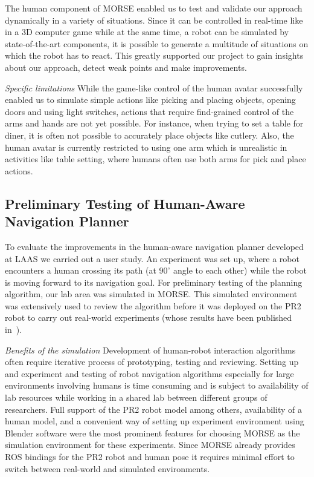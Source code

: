 \documentclass{llncs}
\begin{document}
The human component of MORSE enabled us to test and validate our approach
dynamically in a variety of situations. Since it can be controlled in real-time
like in a 3D computer game while at the same time, a robot can be simulated by
state-of-the-art components, it is possible to generate a multitude of
situations on which the robot has to react. This greatly supported our project
to gain insights about our approach, detect weak points and make improvements.

\emph{Specific limitations} While the game-like control of the human avatar 
successfully enabled us to simulate simple actions like picking and placing objects, 
opening doors and using light switches, actions that require find-grained control 
of the arms and hands are not yet possible. For instance, when trying to set a table for 
diner, it is often not possible to accurately place objects like cutlery. Also, the human
avatar is currently restricted to using one arm which is unrealistic in activities 
like table setting, where humans often use both arms for pick and place actions.
 

\subsection{Preliminary Testing of Human-Aware Navigation Planner}
\label{sc:navigation}

To evaluate the improvements in the human-aware navigation planner developed at
LAAS we carried out a user study. An experiment was set up,
where a robot encounters a human crossing its path (at $90^{\circ }$ angle to
each other) while the robot is moving forward to its navigation goal. For
preliminary testing of the planning algorithm, our lab area was simulated in
MORSE. This simulated environment was extensively used
to review the algorithm before it was deployed on the PR2 robot to carry out
real-world experiments (whose results have been published
in~\cite{ThibaultKruse2014}).


\emph{Benefits of the simulation} Development of human-robot interaction
algorithms often require iterative process of prototyping, testing and
reviewing. Setting up and experiment and testing of robot navigation algorithms
especially for large environments involving humans is time consuming and is
subject to availability of lab resources while working in a shared lab between
different groups of researchers. Full support of the PR2 robot model among
others, availability of a human model, and a convenient way of setting up
experiment environment using Blender software were the most prominent features
for choosing MORSE as the simulation environment for these experiments. Since
MORSE already provides ROS bindings for the PR2 robot and human pose it requires
minimal effort to switch between real-world and simulated environments.
\end{document}
